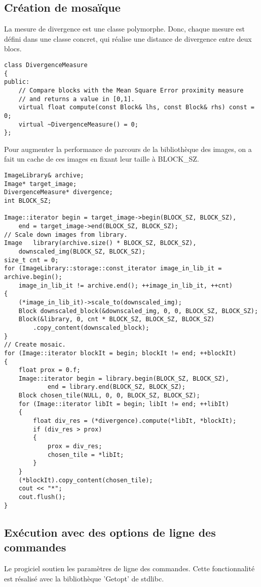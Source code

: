 \documentclass[a4paper]{article}
\begin{document}
\subsection{Cr\'eation de mosa\"ique}
La mesure de divergence est une classe polymorphe.
Donc, chaque mesure est d\'efini dans une classe concret, qui r\'ealise une distance de divergence entre deux blocs.

\begin{lstlisting}
class DivergenceMeasure
{
public:
	// Compare blocks with the Mean Square Error proximity measure
	// and returns a value in [0,1].
	virtual float compute(const Block& lhs, const Block& rhs) const = 0;
	virtual ~DivergenceMeasure() = 0;
};
\end{lstlisting}

Pour augmenter la performance de parcours de la biblioth\`eque des images, on a fait un cache de ces images en fixant leur taille \`a BLOCK\_SZ.

\begin{lstlisting}
ImageLibrary& archive;
Image* target_image;
DivergenceMeasure* divergence;
int BLOCK_SZ;

Image::iterator begin = target_image->begin(BLOCK_SZ, BLOCK_SZ),
	end = target_image->end(BLOCK_SZ, BLOCK_SZ);
// Scale down images from library.
Image	library(archive.size() * BLOCK_SZ, BLOCK_SZ),
	downscaled_img(BLOCK_SZ, BLOCK_SZ);
size_t cnt = 0;
for (ImageLibrary::storage::const_iterator image_in_lib_it = archive.begin();
	image_in_lib_it != archive.end(); ++image_in_lib_it, ++cnt)
{
	(*image_in_lib_it)->scale_to(downscaled_img);
	Block downscaled_block(&downscaled_img, 0, 0, BLOCK_SZ, BLOCK_SZ);
	Block(&library, 0, cnt * BLOCK_SZ, BLOCK_SZ, BLOCK_SZ)
		.copy_content(downscaled_block);
}
// Create mosaic.
for (Image::iterator blockIt = begin; blockIt != end; ++blockIt)
{
	float prox = 0.f;
	Image::iterator	begin = library.begin(BLOCK_SZ, BLOCK_SZ),
			end = library.end(BLOCK_SZ, BLOCK_SZ);
	Block chosen_tile(NULL, 0, 0, BLOCK_SZ, BLOCK_SZ);
	for (Image::iterator libIt = begin; libIt != end; ++libIt)
	{
		float div_res = (*divergence).compute(*libIt, *blockIt);
		if (div_res > prox)
		{
			prox = div_res;
			chosen_tile = *libIt;
		}
	}
	(*blockIt).copy_content(chosen_tile);
	cout << "*";
	cout.flush();
}
\end{lstlisting}

\subsection{Ex\'ecution avec des options de ligne des commandes}
Le progiciel soutien les param\`etres de ligne des commandes.
Cette fonctionnalit\'e est r\'esalis\'e avec la biblioth\`eque 'Getopt' de stdlibc.
\end{document}
